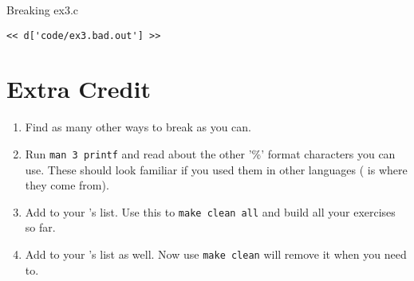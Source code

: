 \begin{Terminal}{Breaking ex3.c}
\begin{lstlisting}
<< d['code/ex3.bad.out'] >>
\end{lstlisting}
\end{Terminal}

\section{Extra Credit}

\begin{enumerate}
\item Find as many other ways to break  as you can.
\item Run \verb|man 3 printf| and read about the other '\%' format
    characters you can use.  These should look familiar if you used
    them in other languages ( is where they come from).
\item Add  to your 's  list.  Use this
    to \verb|make clean all| and build all your exercises so far.
\item Add  to your 's  list as well.
    Now use \verb|make clean| will remove it when you need to.
\end{enumerate}


